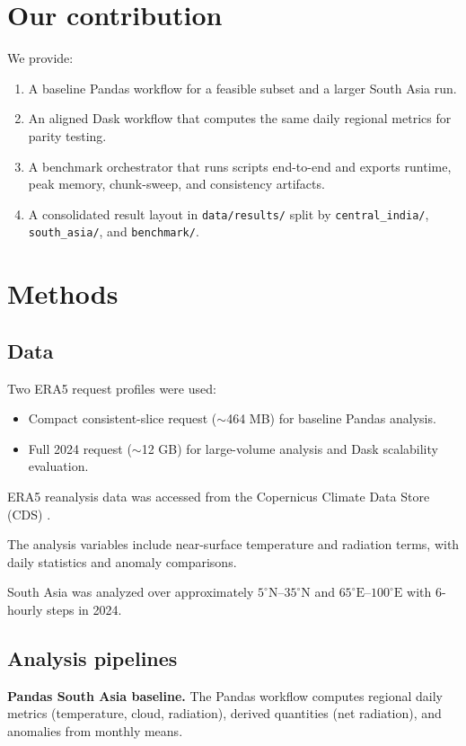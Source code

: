 \section{Our contribution}
We provide:
\begin{enumerate}
    \item A baseline Pandas workflow for a feasible subset and a larger South
    Asia run.
    \item An aligned Dask workflow that computes the same daily regional
    metrics for parity testing.
    \item A benchmark orchestrator that runs scripts end-to-end and exports
    runtime, peak memory, chunk-sweep, and consistency artifacts.
    \item A consolidated result layout in \verb|data/results/| split by
    \verb|central_india/|, \verb|south_asia/|, and \verb|benchmark/|.
\end{enumerate}

\section{Methods}
\subsection{Data}
Two ERA5 request profiles were used:
\begin{itemize}
    \item Compact consistent-slice request ($\sim$464 MB) for baseline
    Pandas analysis.
    \item Full 2024 request ($\sim$12 GB) for large-volume analysis and Dask
    scalability evaluation.
\end{itemize}

ERA5 reanalysis data was accessed from the Copernicus Climate Data Store
(CDS) \citep{era5_cds}.

The analysis variables include near-surface temperature and radiation terms,
with daily statistics and anomaly comparisons.

South Asia was analyzed over approximately $5^{\circ}\mathrm{N}$--$35^{\circ}\mathrm{N}$
and $65^{\circ}\mathrm{E}$--$100^{\circ}\mathrm{E}$ with 6-hourly steps in 2024.

\subsection{Analysis pipelines}
\textbf{Pandas South Asia baseline.}
The Pandas workflow computes regional daily metrics (temperature, cloud,
radiation), derived quantities (net radiation), and anomalies from monthly
means.

